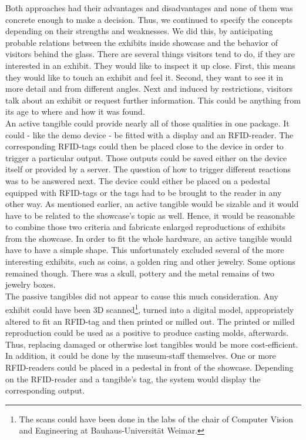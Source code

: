 Both approaches had their advantages and disadvantages and none of them was concrete enough to make a decision. Thus, we continued to specify the concepts depending on their strengths and weaknesses. We did this, by anticipating probable relations between the exhibits inside showcase and the behavior of visitors behind the glass. There are several things visitors tend to do, if they are interested in an exhibit. They would like to inspect it up close. First, this means they would like to touch an exhibit and feel it. Second, they want to see it in more detail and from different angles. Next and induced by restrictions, visitors talk about an exhibit or  request further information. This could be anything from its age to where and how it was found.
\\
An active tangible could provide nearly all of those qualities in one package. It could - like the demo device - be fitted with a display and an \ac{RFID}-reader. The corresponding \ac{RFID}-tags could then be placed close to the device in order to trigger a particular output. Those outputs could be saved either on the device itself or provided by a server. The question of how to trigger different reactions was to be answered next. The device could either be placed on a pedestal equipped with \ac{RFID}-tags or the tags had to be brought to the reader in any other way. As mentioned earlier, an active tangible would be sizable and it would have to be related to the showcase's topic as well. Hence, it would be reasonable to combine those two criteria and fabricate enlarged reproductions of exhibits from the showcase. In order to fit the whole hardware, an active tangible would have to have a simple shape. This unfortunately excluded several of the more interesting exhibits, such as coins, a golden ring and other jewelry. Some options remained though. There was a skull, pottery and the metal remains of two jewelry boxes.
\\
The passive tangibles did not appear to cause this much consideration. Any exhibit could have been \ac{3D} scanned\footnote{The scans could have been done in the labs of the chair of Computer Vision and Engineering at Bauhaus-Universität Weimar.}, turned into a digital model, appropriately altered to fit an \ac{RFID}-tag and then printed or milled out. The printed or milled reproduction could be used as a positive to produce casting molds, afterwards. Thus, replacing damaged or otherwise lost tangibles would be more cost-efficient. In addition, it could be done by the museum-staff themselves. One or more \ac{RFID}-readers could be placed in a pedestal in front of the showcase. Depending on the \ac{RFID}-reader and a tangible's tag, the system would display the corresponding output.
